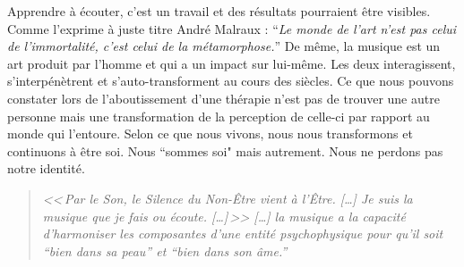 Apprendre à écouter,
c'est un travail et des résultats pourraient être visibles.
Comme l'exprime à juste titre André Malraux : \enquote{\emph{Le monde de
	l'art n'est pas celui de l'immortalité, c'est celui de la métamorphose.}}
De même, la musique est un art produit par l'homme et qui a un impact
sur lui-même. Les deux interagissent, s'interpénètrent et s'auto-transforment
au cours des siècles.
 Ce que nous pouvons constater lors de l'aboutissement
d'une thérapie n'est pas de trouver une autre personne mais une transformation
de la perception de celle-ci par rapport au monde qui l'entoure. 
Selon
ce que nous vivons, nous nous transformons et continuons à être
soi. Nous ``sommes soi" mais autrement. Nous ne perdons
pas notre identité.


\label{jeSuisLaMusique:viret}
\begin{quotation}
\emph{<<\,\emph{Par le Son, le Silence du Non-Être vient à l'Être}. [\dots] 
\textsl{Je suis}
	\emph{la musique que je fais ou écoute}. [\dots]\,>>
[\ldots] \emph{la musique a la capacité d'harmoniser
les composantes d'une entité psychophysique pour qu'il soit ``bien
dans sa peau'' et ``bien dans son âme.}''}\, \autocite[ch. 1,  p. 8]{viret:b}
\end{quotation}




